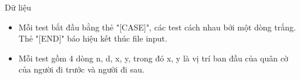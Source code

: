 Dữ liệu  
\begin{itemize}
	\item     Mỗi test bắt đầu bằng thẻ "[CASE]", các test cách nhau bởi một dòng trắng. Thẻ "[END]" báo hiệu kết thúc file input.   
	\item     Mỗi test gồm 4 dòng n, d, x, y, trong đó x, y là vị trí ban đầu của quân cờ của người đi trước và người đi sau.   
\end{itemize}
